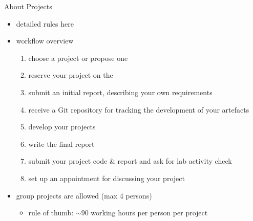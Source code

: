 \documentclass[presentation]{beamer}\mode<presentation>{\usetheme{AMSBolognaFC}}
\begin{document}
\begin{frame}[c]{About Projects}
    \begin{itemize}
        \item detailed rules here
        \\
        \uurl{\projectRules}

        \vfill

        \item workflow overview
        \begin{enumerate}
            \item \alert{choose} a project or \alert{propose} one
            \item reserve your project on the 
            \item submit an \alert{initial report}, describing your own requirements
            \item receive a Git repository for tracking the development of your artefacts
            \item develop your projects
            \item write the \alert{final report}
            \item submit your project \alert{code \& report} and ask for lab activity check
            \item set up an appointment for discussing your project
        \end{enumerate}

        \vfill

        \item group projects are allowed (max 4 persons)
        \begin{itemize}
            \item rule of thumb: $\sim90$ working hours per person per project
        \end{itemize}
    \end{itemize}
\end{frame}
\end{document}
